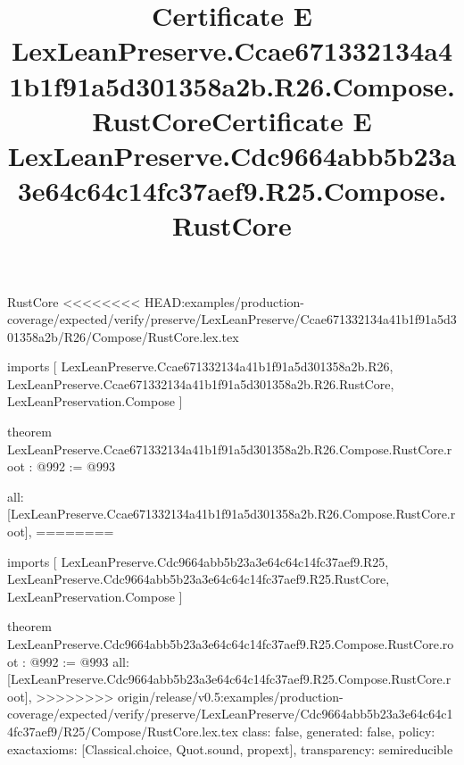 \begin{lexlean}{RustCore}
<<<<<<<< HEAD:examples/production-coverage/expected/verify/preserve/LexLeanPreserve/Ccae671332134a41b1f91a5d301358a2b/R26/Compose/RustCore.lex.tex
\title{Certificate E LexLeanPreserve.Ccae671332134a41b1f91a5d301358a2b.R26.Compose.RustCore}
\begin{coremodule}
imports [
  LexLeanPreserve.Ccae671332134a41b1f91a5d301358a2b.R26,
  LexLeanPreserve.Ccae671332134a41b1f91a5d301358a2b.R26.RustCore,
  LexLeanPreservation.Compose
]

theorem LexLeanPreserve.Ccae671332134a41b1f91a5d301358a2b.R26.Compose.RustCore.root : @992 := @993 {
  all: [LexLeanPreserve.Ccae671332134a41b1f91a5d301358a2b.R26.Compose.RustCore.root],
========
\title{Certificate E LexLeanPreserve.Cdc9664abb5b23a3e64c64c14fc37aef9.R25.Compose.RustCore}
\begin{coremodule}
imports [
  LexLeanPreserve.Cdc9664abb5b23a3e64c64c14fc37aef9.R25,
  LexLeanPreserve.Cdc9664abb5b23a3e64c64c14fc37aef9.R25.RustCore,
  LexLeanPreservation.Compose
]

theorem LexLeanPreserve.Cdc9664abb5b23a3e64c64c14fc37aef9.R25.Compose.RustCore.root : @992 := @993 {
  all: [LexLeanPreserve.Cdc9664abb5b23a3e64c64c14fc37aef9.R25.Compose.RustCore.root],
>>>>>>>> origin/release/v0.5:examples/production-coverage/expected/verify/preserve/LexLeanPreserve/Cdc9664abb5b23a3e64c64c14fc37aef9/R25/Compose/RustCore.lex.tex
  class: false,
  generated: false,
  policy: exact{axioms: [Classical.choice, Quot.sound, propext]},
  transparency: semireducible
}


\end{coremodule}}
\end{coremodule}
\end{lexlean}
